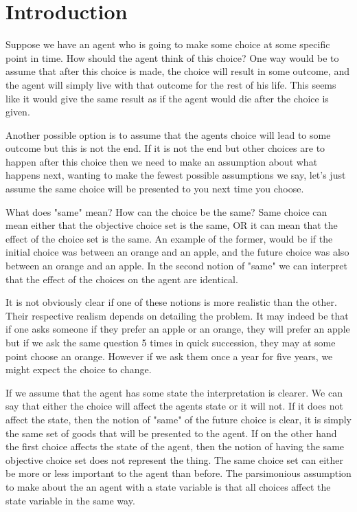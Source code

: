 \documentclass[12pt]{report}
\numberwithin{equation}{section}
\begin{document}
\section{Introduction}

Suppose we have an agent who is going to make some choice at some specific point in time. How should the agent think of this choice? One way would be to assume that after this choice is made, the choice will result in some outcome, and the agent will simply live with that outcome for the rest of his life. This seems like it would give the same result as if the agent would die after the choice is given.

Another possible option is to assume that the agents choice will lead to some outcome but this is not the end. If it is not the end but other choices are to happen after this choice then we need to make an assumption about what happens next, wanting to make the fewest possible assumptions we say, let's just assume the same choice will be presented to you next time you choose. 

What does "same" mean? How can the choice be the same? Same choice can mean either that the objective choice set is the same, OR it can mean that the effect of the choice set is the same. An example of the former, would be if the initial choice was between an orange and an apple, and the future choice was also between an orange and an apple. In the second notion of "same" we can interpret that the effect of the choices on the agent are identical. 

It is not obviously clear if one of these notions is more realistic than the other. Their respective realism depends on detailing the problem. It may indeed be that if one asks someone if they prefer an apple or an orange, they will prefer an apple but if we ask the same question 5 times in quick succession, they may at some point choose an orange. However if we ask them once a year for five years, we might expect the choice to change. 

If we assume that the agent has some state the interpretation is clearer. We can say that either the choice will affect the agents state or it will not. If it does not affect the state, then the notion of "same" of the future choice is clear, it is simply the same set of goods that will be presented to the agent. If on the other hand the first choice affects the state of the agent, then the notion of having the same objective choice set does not represent the thing. The same choice set can either be more or less important to the agent than before. The parsimonious assumption to make about the an agent with a state variable is that all choices affect the state variable in the same way. 
\end{document}
